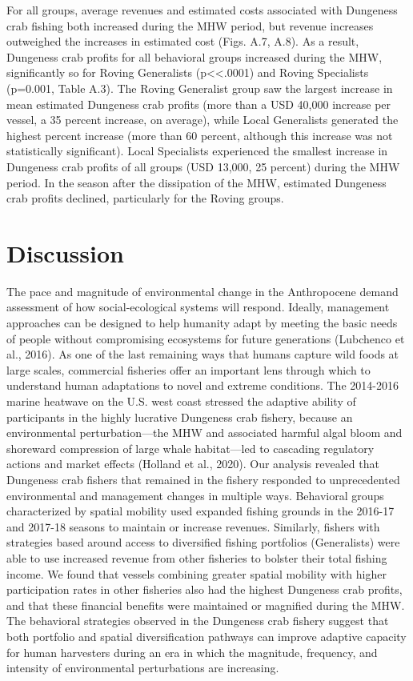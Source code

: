 \documentclass[]{elsarticle} %
\begin{document}
For all groups, average revenues and estimated costs associated with
Dungeness crab fishing both increased during the MHW period, but revenue
increases outweighed the increases in estimated cost (Figs. A.7, A.8).
As a result, Dungeness crab profits for all behavioral groups increased
during the MHW, significantly so for Roving Generalists
(p\textless\textless.0001) and Roving Specialists (p=0.001, Table A.3).
The Roving Generalist group saw the largest increase in mean estimated
Dungeness crab profits (more than a USD 40,000 increase per vessel, a 35
percent increase, on average), while Local Generalists generated the
highest percent increase (more than 60 percent, although this increase
was not statistically significant). Local Specialists experienced the
smallest increase in Dungeness crab profits of all groups (USD 13,000,
25 percent) during the MHW period. In the season after the dissipation
of the MHW, estimated Dungeness crab profits declined, particularly for
the Roving groups.

\hypertarget{discussion}{%
\section{Discussion}\label{discussion}}

The pace and magnitude of environmental change in the Anthropocene
demand assessment of how social-ecological systems will respond.
Ideally, management approaches can be designed to help humanity adapt by
meeting the basic needs of people without compromising ecosystems for
future generations (Lubchenco et al., 2016). As one of the last
remaining ways that humans capture wild foods at large scales,
commercial fisheries offer an important lens through which to understand
human adaptations to novel and extreme conditions. The 2014-2016 marine
heatwave on the U.S. west coast stressed the adaptive ability of
participants in the highly lucrative Dungeness crab fishery, because an
environmental perturbation---the MHW and associated harmful algal bloom
and shoreward compression of large whale habitat---led to cascading
regulatory actions and market effects (Holland et al., 2020). Our
analysis revealed that Dungeness crab fishers that remained in the
fishery responded to unprecedented environmental and management changes
in multiple ways. Behavioral groups characterized by spatial mobility
used expanded fishing grounds in the 2016-17 and 2017-18 seasons to
maintain or increase revenues. Similarly, fishers with strategies based
around access to diversified fishing portfolios (Generalists) were able
to use increased revenue from other fisheries to bolster their total
fishing income. We found that vessels combining greater spatial mobility
with higher participation rates in other fisheries also had the highest
Dungeness crab profits, and that these financial benefits were
maintained or magnified during the MHW. The behavioral strategies
observed in the Dungeness crab fishery suggest that both portfolio and
spatial diversification pathways can improve adaptive capacity for human
harvesters during an era in which the magnitude, frequency, and
intensity of environmental perturbations are increasing.
\end{document}
